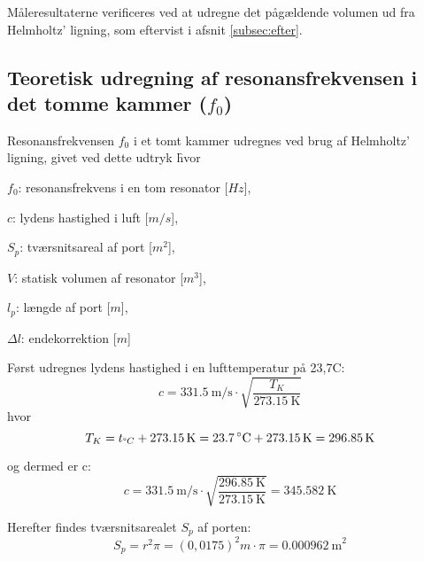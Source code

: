 Måleresultaterne verificeres ved at udregne det pågældende volumen ud fra Helmholtz' ligning, som eftervist i afsnit \ref{subsec:efter}.

\subsection{Teoretisk udregning af resonansfrekvensen i det tomme kammer ($f_{0}$)} 

Resonansfrekvensen $f_{0}$ i et tomt kammer udregnes ved brug af Helmholtz' ligning, givet ved dette udtryk \f

hvor 
\begin{description}[align=left,labelindent=0.3cm]
\item $f_{0}$: resonansfrekvens i en tom resonator [$Hz$],\\
\item $c$: lydens hastighed i luft [$m/s$],\\
\item $S_{p}$: tværsnitsareal af port [$m^2$],\\
\item $V$: statisk volumen af resonator [$m^3$],\\
\item $l_{p}$: længde af port [$m$],\\
\item $\Delta l$: endekorrektion [$m$]\\
\end{description}

Først udregnes lydens hastighed i en lufttemperatur på 23,7\degree C:
\begin{equation}
		c = {\SI{331,5}{\meter / \second}} \cdot \sqrt{\frac{T_{K}}{\SI{273,15}{\kelvin}}}	\end{equation}
 hvor 		
\begin{equation}
		T_{K} = t_{\degree C} + {\SI{273,15}{\kelvin}} = {\SI{23,7}{\degree C}} + {\SI{273,15}{\kelvin}} = {\SI{296,85}{\kelvin}}	
\end{equation}

og dermed er c: 
\begin{equation}
		c = {\SI{331,5}{\meter / \second}} \cdot \sqrt{\frac{\SI{296,85}{\kelvin}}{\SI{273,15}{\kelvin}}} = {\SI{345,582}{\kelvin}}	\end{equation}
		
Herefter findes tværsnitsarealet $S_{p}$ af porten:
\begin{equation}
		S_{p} = r^2\pi = (0,0175)^2 m \cdot \pi	= {\SI{0,000962}{\meter}^2}
\end{equation}

